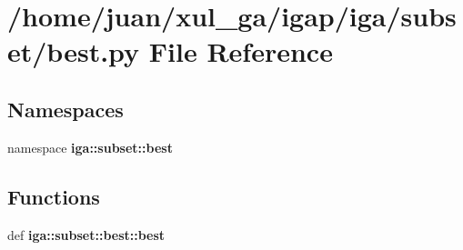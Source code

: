 \section{/home/juan/xul\_\-ga/igap/iga/subset/best.py File Reference}
\label{subset_2best_8py}
\subsection*{Namespaces}
\begin{CompactItemize}
\item 
namespace {\bf iga::subset::best}
\end{CompactItemize}
\subsection*{Functions}
\begin{CompactItemize}
\item 
def {\bf iga::subset::best::best}
\end{CompactItemize}
